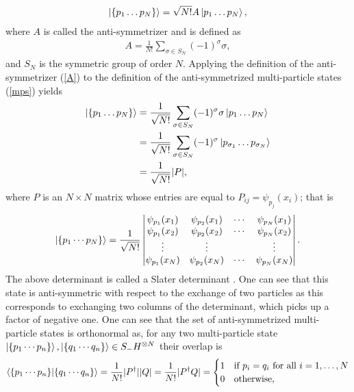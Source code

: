 \documentclass[10pt]{article}
\begin{document}
\begin{align}
\label{mps}
\ket{\{p_1\ldots p_N\}}=\sqrt{N!}A\ket{p_1\ldots p_N},
\end{align}
where $A$ is called the anti-symmetrizer and is defined as
\begin{align}
\label{A}
A = \frac{1}{N!}\sum_{\sigma\in S_N}(-1)^\sigma \sigma,
\end{align}
and $S_N$ is the symmetric group of order $N$. Applying the definition of the anti-symmetrizer (\ref{A}) to the definition of the anti-symmetrized multi-particle states (\ref{mps}) yields
\begin{align}
\ket{\{p_1\ldots p_N\}}
&=\frac{1}{\sqrt{N!}}\sum_{\sigma\in S_N}(-1)^\sigma \sigma\ket{p_1\ldots p_N} \\
&=\frac{1}{\sqrt{N!}}\sum_{\sigma\in S_N}(-1)^\sigma\ket*{p_{{\sigma_1}}\ldots p_{{\sigma_N}}} \\
&=\frac{1}{\sqrt{N!}}|P|,
\end{align}
where $P$ is an $N\times N$ matrix whose entries are equal to $P_{ij}=\psi_{p_j}(x_i)$; that is
\begin{align}
\ket{\{p_1\cdots p_N\}}
=
\frac{1}{\sqrt{N!}}
\begin{vmatrix}
\psi_{p_1}(x_1) & \psi_{p_2}(x_1) & \cdots & \psi_{p_N}(x_1) \\
\psi_{p_1}(x_2) & \psi_{p_2}(x_2) & \cdots & \psi_{p_N}(x_2) \\
\vdots & \vdots &  & \vdots \\
\psi_{p_1}(x_N) & \psi_{p_2}(x_N) & \cdots & \psi_{p_N}(x_N) \\
\end{vmatrix}.
\end{align}
The above determinant is called a Slater determinant \cite{slater}. One can see that this state is anti-symmetric with respect to the exchange of two particles as this corresponds to exchanging two columns of the determinant, which picks up a factor of negative one. One can see that the set of anti-symmetrized multi-particle states is orthonormal as, for any two multi-particle state $\ket{\{p_1\cdots p_n\}},\ket{\{q_1\cdots q_n\}}\in S_-H^{\otimes N}$ their overlap is
\begin{align}
\bra{\{p_1\cdots p_n\}}\ket{\{q_1\cdots q_n\}}=\frac{1}{N!}|P^{\dagger}||Q|=\frac{1}{N!}|P^{\dagger}Q|=
\begin{cases}
1 & \text{if} \ p_i=q_i \ \text{for all} \ i=1,\ldots ,N \\
0 & \text{otherwise},
\end{cases}
\end{align}
\end{document}
